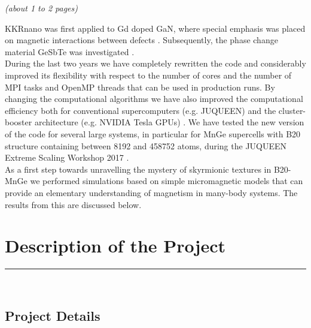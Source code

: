 \documentclass [a4paper, 12pt]{article}
\begin{document}
\textit{(about 1 to 2 pages)}

KKRnano was first applied to Gd doped GaN, where special emphasis was placed on
magnetic interactions between defects \cite{thiess_superparamagnetism_2012}. Subsequently,
the phase change material GeSbTe was investigated \cite{zhang_role_2012}.
\\
During the last two years we have completely rewritten the code and considerably improved 
its flexibility with respect to the number of cores and the number of MPI tasks and
OpenMP threads that can be used in production runs. By changing the computational algorithms
we have also improved the computational efficiency both for conventional
supercomputers (e.g. JUQUEEN) and the cluster-booster architecture
(e.g. NVIDIA Tesla GPUs) \cite{dutot_addressing_2016}. 
We have tested the new version of the code for several large systems, 
in particular for MnGe supercells with B20 structure containing between 8192 and 458752 atoms,
during the JUQUEEN Extreme Scaling Workshop 2017 \cite{brommel_juqueen_2017}.
\\
As a first step towards unravelling the mystery of skyrmionic textures in B20-MnGe we
performed simulations based on simple micromagnetic models that can provide an elementary understanding
of magnetism in many-body systems. The results from this are discussed below.

\section{Description of the Project}
\rule{\textwidth}{0.4pt}\\
\subsection{Project Details}
\end{document}
